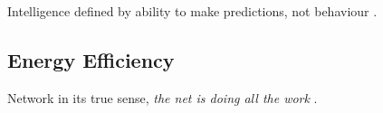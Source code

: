 \documentclass[12pt, a4paper]{article}
\begin{document}
Intelligence defined by ability to make predictions, not behaviour \cite{intelligence_is_prediction}.

%
%
%
%
%
%

\subsection{Energy Efficiency}

Network in its true sense, \textit{the net is doing all the work} \cite{net_doing_all_the_work}.

\cite{ahah}

\end{document}
